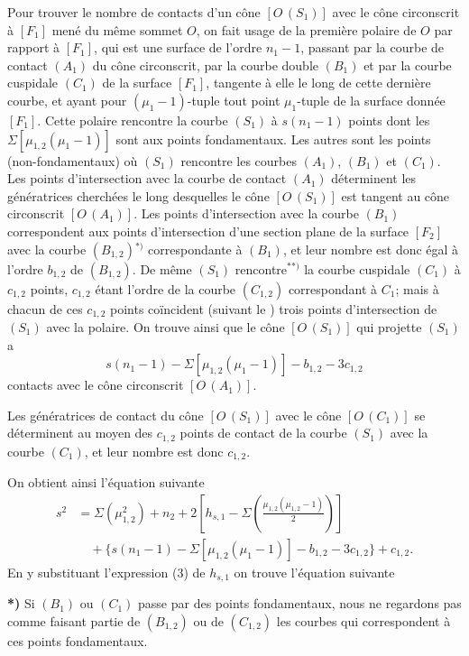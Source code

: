 \documentclass{article}
\begin{document}
Pour trouver le nombre de contacts d'un cône $[O\,(S_1)]$ avec le cône circonscrit à $[F_1]$ mené du même sommet $O$, on fait usage de la première polaire de $O$ par rapport à $[F_1]$, qui est une surface de l'ordre $n_1 - 1$, passant par la courbe de contact $(A_1)$ du cône circonscrit, par la courbe double $(B_1)$ et par la courbe cuspidale $(C_1)$ de la surface $[F_1]$, tangente à elle le long de cette dernière courbe, et ayant pour $(\mu_1 - 1)$-tuple tout point $\mu_1$-tuple de la surface donnée $[F_1]$. Cette polaire rencontre la courbe $(S_1)$ à $s(n_1 - 1)$ points dont les $\Sigma[\mu_{1, 2}(\mu_1 - 1)]$ sont aux points fondamentaux. Les autres sont les points (non-fondamentaux) où $(S_1)$ rencontre les courbes $(A_1)$, $(B_1)$ et $(C_1)$. Les points d'intersection avec la courbe de contact $(A_1)$ déterminent les génératrices cherchées le long desquelles le cône $[O\,(S_1)]$ est tangent au cône circonscrit $[O\,(A_1)]$. Les points d'intersection avec la courbe $(B_1)$ correspondent aux points d'intersection d'une section plane de la surface $[F_2]$ avec la courbe $(B_{1, 2})$${}^{*)}$ correspondante à $(B_1)$, et leur nombre est donc égal à l'ordre $b_{1, 2}$ de $(B_{1, 2})$. De même $(S_1)$ rencontre${}^{**)}$ la courbe cuspidale $(C_1)$ à $c_{1, 2}$ points, $c_{1, 2}$ étant l'ordre de la courbe $(C_{1, 2})$ correspondant à $C_1$; mais à chacun de ces $c_{1, 2}$ points coïncident (suivant le ) trois points d'intersection de $(S_1)$ avec la polaire. On trouve ainsi que le cône $[O\,(S_1)]$ qui projette $(S_1)$ a
\[
s(n_1 - 1) - \Sigma [\mu_{1, 2}(\mu_1 - 1)] - b_{1, 2} - 3c_{1, 2}
\]
contacts avec le cône circonscrit $[O\,(A_1)]$.

Les génératrices de contact du cône $[O\,(S_1)]$ avec le cône $[O\,(C_1)]$ se déterminent au moyen des $c_{1, 2}$ points de contact de la courbe $(S_1)$ avec la courbe $(C_1)$, et leur nombre est donc $c_{1, 2}$.

On obtient ainsi l'équation suivante
\[
\begin{aligned}
s^2 &= \Sigma(\mu_{1, 2}^2) + n_2 + 2\left[ h_{s, 1} - \Sigma\left( \frac{\mu_{1, 2}(\mu_{1, 2} - 1)}{2} \right) \right] \\
&\quad + \{s(n_1 - 1) - \Sigma[\mu_{1, 2}(\mu_1 - 1)] - b_{1, 2} - 3c_{1, 2}\} + c_{1, 2}.
\end{aligned}
\]
En y substituant l'expression (3) de $h_{s, 1}$ on trouve l'équation suivante

\textbf{*)} Si $(B_1)$ ou $(C_1)$ passe par des points fondamentaux, nous ne regardons pas comme faisant partie de $(B_{1, 2})$ ou de $(C_{1, 2})$ les courbes qui correspondent à ces points fondamentaux.
\end{document}

